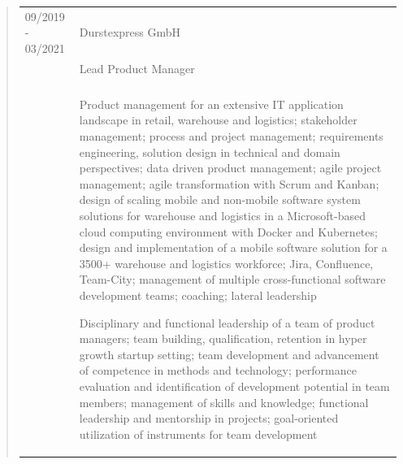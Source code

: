 	\begin{quote}
		\begin{tabular}{p{4cm}l}
			09/2019 - 03/2021&Durstexpress GmbH\\
			&Lead Product Manager\\
			\\
			&\begin{minipage}{10cm}
				Product management for an extensive IT application landscape in retail, warehouse and logistics; 
				stakeholder management; process and project management; requirements engineering, solution design in technical and domain perspectives;
				data driven product management; agile project management; agile transformation with Scrum and Kanban; design of scaling mobile and 				non-mobile software system solutions for warehouse and logistics in a Microsoft-based cloud computing environment with Docker and Kubernetes; 
				design and implementation of a mobile software solution for a 3500+ warehouse and logistics workforce; 
				Jira, Confluence, Team-City; management of multiple cross-functional software development teams; coaching; lateral leadership\newline
				
				Disciplinary and functional leadership of a team of product managers; team building, qualification, retention in hyper growth startup 				setting; team development and advancement of competence in methods and technology; performance evaluation and 
				identification of development potential in team members; management of skills and knowledge; functional 
				leadership and mentorship in projects; goal-oriented utilization of instruments for team development
			\end{minipage}
		\end{tabular}
	\end{quote}
